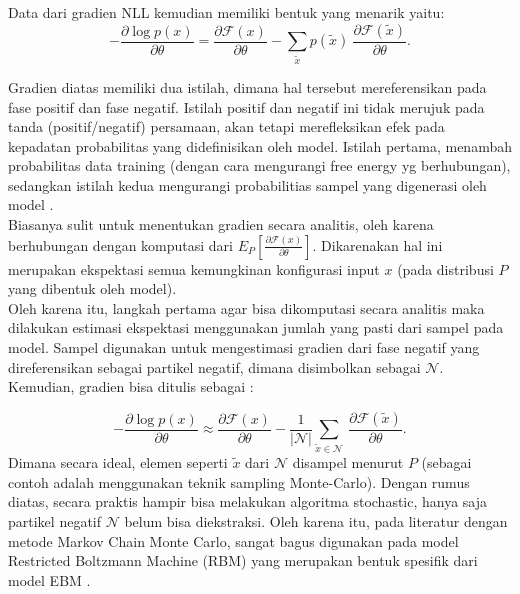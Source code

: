 Data dari gradien NLL kemudian memiliki bentuk yang menarik yaitu:
\begin{equation}
- \frac{\partial  \log p(x)}{\partial \theta}
 = \frac{\partial \mathcal{F}(x)}{\partial \theta} -
       \sum_{\tilde{x}} p(\tilde{x}) \
           \frac{\partial \mathcal{F}(\tilde{x})}{\partial \theta}.
\end{equation}

Gradien diatas memiliki dua istilah, dimana hal tersebut mereferensikan pada fase positif dan fase negatif. Istilah positif dan negatif ini tidak merujuk pada tanda (positif/negatif)  persamaan, akan tetapi merefleksikan efek pada kepadatan probabilitas yang didefinisikan oleh model. Istilah pertama, menambah probabilitas data training (dengan cara mengurangi free energy yg berhubungan), sedangkan istilah kedua mengurangi probabilitias sampel yang digenerasi oleh model \citep{poultney2006efficient}.\\

Biasanya sulit untuk menentukan gradien secara analitis, oleh karena berhubungan dengan komputasi dari $E_P [ \frac{\partial \mathcal{F}(x)} {\partial \theta} ]$. Dikarenakan hal ini merupakan ekspektasi semua kemungkinan konfigurasi input $x$ (pada distribusi $P$ yang dibentuk oleh model).\\
Oleh karena itu, langkah pertama agar bisa dikomputasi secara analitis maka dilakukan estimasi ekspektasi menggunakan jumlah yang pasti dari sampel pada model. Sampel digunakan untuk mengestimasi gradien dari fase negatif yang direferensikan sebagai partikel negatif, dimana disimbolkan sebagai $\mathcal{N}$. Kemudian, gradien bisa ditulis sebagai \citep{poultney2006efficient} : 

\begin{equation}
- \frac{\partial \log p(x)}{\partial \theta}
 \approx
  \frac{\partial \mathcal{F}(x)}{\partial \theta} -
   \frac{1}{|\mathcal{N}|}\sum_{\tilde{x} \in \mathcal{N}} \
   \frac{\partial \mathcal{F}(\tilde{x})}{\partial \theta}.
\end{equation}
Dimana secara ideal, elemen seperti $\tilde{x}$ dari $\mathcal{N}$ disampel menurut $P$ (sebagai contoh adalah menggunakan teknik sampling Monte-Carlo). Dengan rumus diatas, secara praktis hampir bisa melakukan algoritma stochastic, hanya saja partikel negatif $\mathcal{N}$ belum bisa diekstraksi. Oleh karena itu, pada literatur dengan metode Markov Chain Monte Carlo, sangat bagus digunakan pada model Restricted Boltzmann Machine (RBM) yang merupakan bentuk spesifik dari model EBM \citep{tutorial2014lisa}.


